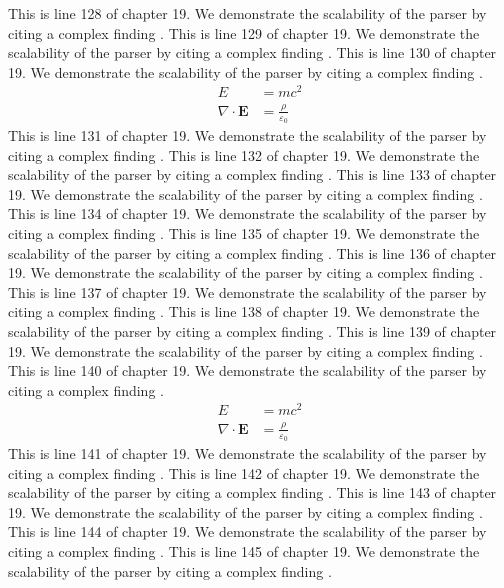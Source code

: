 This is line 128 of chapter 19. We demonstrate the scalability of the parser by citing a complex finding \cite{ref19_128}.
This is line 129 of chapter 19. We demonstrate the scalability of the parser by citing a complex finding \cite{ref19_129}.
This is line 130 of chapter 19. We demonstrate the scalability of the parser by citing a complex finding \cite{ref19_130}.
\begin{align*}
  E &= mc^2 \\
  \nabla \cdot \mathbf{E} &= \frac{\rho}{\varepsilon_0}
\end{align*}
This is line 131 of chapter 19. We demonstrate the scalability of the parser by citing a complex finding \cite{ref19_131}.
This is line 132 of chapter 19. We demonstrate the scalability of the parser by citing a complex finding \cite{ref19_132}.
This is line 133 of chapter 19. We demonstrate the scalability of the parser by citing a complex finding \cite{ref19_133}.
This is line 134 of chapter 19. We demonstrate the scalability of the parser by citing a complex finding \cite{ref19_134}.
This is line 135 of chapter 19. We demonstrate the scalability of the parser by citing a complex finding \cite{ref19_135}.
This is line 136 of chapter 19. We demonstrate the scalability of the parser by citing a complex finding \cite{ref19_136}.
This is line 137 of chapter 19. We demonstrate the scalability of the parser by citing a complex finding \cite{ref19_137}.
This is line 138 of chapter 19. We demonstrate the scalability of the parser by citing a complex finding \cite{ref19_138}.
This is line 139 of chapter 19. We demonstrate the scalability of the parser by citing a complex finding \cite{ref19_139}.
This is line 140 of chapter 19. We demonstrate the scalability of the parser by citing a complex finding \cite{ref19_140}.
\begin{align*}
  E &= mc^2 \\
  \nabla \cdot \mathbf{E} &= \frac{\rho}{\varepsilon_0}
\end{align*}
This is line 141 of chapter 19. We demonstrate the scalability of the parser by citing a complex finding \cite{ref19_141}.
This is line 142 of chapter 19. We demonstrate the scalability of the parser by citing a complex finding \cite{ref19_142}.
This is line 143 of chapter 19. We demonstrate the scalability of the parser by citing a complex finding \cite{ref19_143}.
This is line 144 of chapter 19. We demonstrate the scalability of the parser by citing a complex finding \cite{ref19_144}.
This is line 145 of chapter 19. We demonstrate the scalability of the parser by citing a complex finding \cite{ref19_145}.
